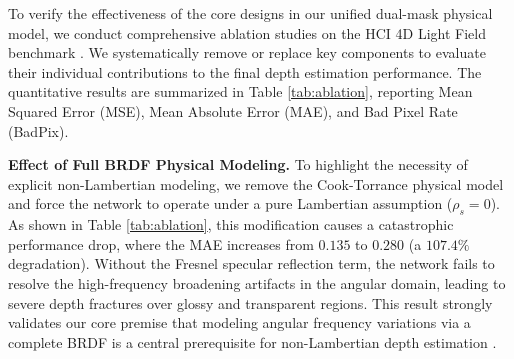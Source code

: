 \documentclass[lettersize,journal]{IEEEtran}
\begin{document}
To verify the effectiveness of the core designs in our unified dual-mask physical model, we conduct comprehensive ablation studies on the HCI 4D Light Field benchmark \cite{honauer2016}. We systematically remove or replace key components to evaluate their individual contributions to the final depth estimation performance. The quantitative results are summarized in Table \ref{tab:ablation}, reporting Mean Squared Error (MSE), Mean Absolute Error (MAE), and Bad Pixel Rate (BadPix).

\begin{table}[htbp]
\centering
\caption{Ablation study results on the HCI 4D Light Field benchmark. We evaluate the contribution of each proposed module using MSE, MAE, and BadPix metrics.}
\label{tab:ablation}
\end{table}

\textbf{Effect of Full BRDF Physical Modeling.} To highlight the necessity of explicit non-Lambertian modeling, we remove the Cook-Torrance physical model and force the network to operate under a pure Lambertian assumption ($\rho_s = 0$). As shown in Table \ref{tab:ablation}, this modification causes a catastrophic performance drop, where the MAE increases from $0.135$ to $0.280$ (a $107.4\%$ degradation). Without the Fresnel specular reflection term, the network fails to resolve the high-frequency broadening artifacts in the angular domain, leading to severe depth fractures over glossy and transparent regions. This result strongly validates our core premise that modeling angular frequency variations via a complete BRDF is a central prerequisite for non-Lambertian depth estimation \cite{blinn1977}.
\end{document}

